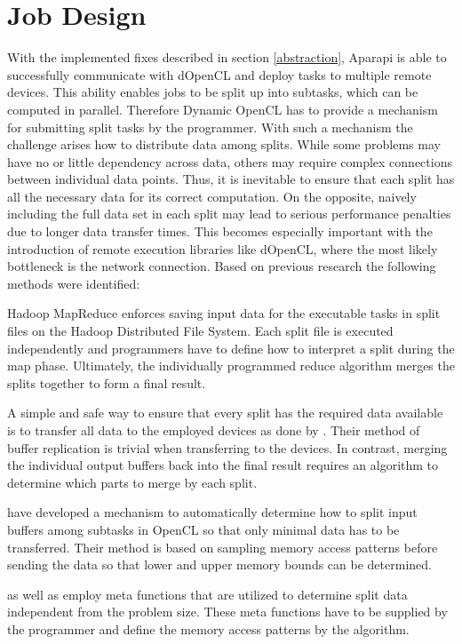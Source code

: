 \section{Job Design}
\label{job_design}
With the implemented fixes described in section \ref{abstraction}, Aparapi is able to successfully communicate with dOpenCL and deploy tasks to multiple remote devices. This ability enables jobs to be split up into subtasks, which can be computed in parallel. Therefore Dynamic OpenCL has to provide a mechanism for submitting split tasks by the programmer. With such a mechanism the challenge arises how to distribute data among splits. While some problems may have no or little dependency across data, others may require complex connections between individual data points. Thus, it is inevitable to ensure that each split has all the necessary data for its correct computation. On the opposite, naively including the full data set in each split may lead to serious performance penalties due to longer data transfer times. This becomes especially important with the introduction of remote execution libraries like dOpenCL, where the most likely bottleneck is the network connection. Based on previous research the following methods were identified:

\begin{description}[style=nextline]
	\item [Manual Splits]
	Hadoop MapReduce enforces saving input data for the executable tasks in split files on the Hadoop Distributed File System. Each split file is executed independently and programmers have to define how to interpret a split during the map phase. Ultimately, the individually programmed reduce algorithm merges the splits together to form a final result.

	\item [Naive Buffer Replication]
	A simple and safe way to ensure that every split has the required data available is to transfer all data to the employed devices as done by \citeauthor{delalama_2012}\cite{delalama_2012}. Their method of buffer replication is trivial when transferring to the devices. In contrast, merging the individual output buffers back into the final result requires an algorithm to determine which parts to merge by each split.

	\item [Intelligent Buffer Replication]
	\citeauthor{Kim_2011}\cite{Kim_2011} have developed a mechanism to automatically determine how to split input buffers among subtasks in OpenCL so that only minimal data has to be transferred. Their method is based on sampling memory access patterns before sending the data so that lower and upper memory bounds can be determined.

	\item [Meta Functions]
	\citeauthor{stepocl}\cite{stepocl} as well as \citeauthor{distcl}\cite{distcl} employ meta functions that are utilized to determine split data independent from the problem size. These meta functions have to be supplied by the programmer and define the memory access patterns by the algorithm.

\end{description}

